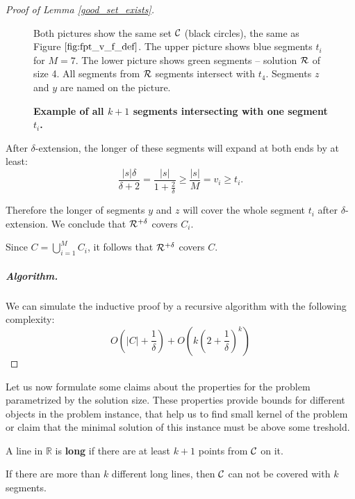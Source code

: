\begin{proof}[Proof of Lemma \ref{good_set_exists}]
\begin{figure}[h]
\def\svgwidth{\columnwidth}

\caption{\textbf{Example of all $k+1$ segments intersecting with one segment $t_i$.}}
Both pictures show the same set $\mathcal{C}$ (black circles), the same as Figure $\ref{fig:fpt_v_f_def}$.
The upper picture shows blue segments $t_i$ for $M=7$.
The lower picture shows green segments -- solution $\mathcal{R}$ of size 4.
All segments from $\mathcal{R}$ segments intersect with $t_4$.
Segments $z$ and $y$ are named on the picture.
\label{fig:fpt_tricky_case}
\end{figure}

After $\delta$-extension, the longer of these segments will
expand at both ends by at least:
$$\frac{|s|\delta}{\delta+2} = \frac{|s|}{1+\frac{2}{\delta}} \ge \frac{|s|}{M} = v_i \ge t_i.$$

Therefore the longer of segments $y$ and $z$ will cover the whole segment $t_i$
after $\delta$-extension. We conclude that $\mathcal{R}^{+\delta}$ covers $C_i$.

Since $C = \bigcup_{i=1}^M C_i$,
it follows that $\mathcal{R}^{+\delta}$ covers $C$.


\subparagraph{Algorithm.}

We can simulate the inductive proof by a recursive algorithm with
the following complexity:
$$O(|C|+\frac{1}{\delta}) + O(k(2+\frac{1}{\delta})^k)$$

\end{proof}

Let us now formulate some claims about the
properties for the problem parametrized by the solution size.
These properties provide bounds for different
objects in the problem instance,
that help us to find small kernel of the problem
or claim that the minimal
solution of this instance must be above some treshold.

\begin{defi}
A line in $\mathbb{R}$ is \textbf{long} if there are at least $k+1$ points from $\mathcal{C}$ on it.
\end{defi}

\begin{claim}
\label{few_long_lines}
If there are more than $k$ different long lines, then 
$\mathcal{C}$ can not be covered with $k$ segments.
\end{claim}

